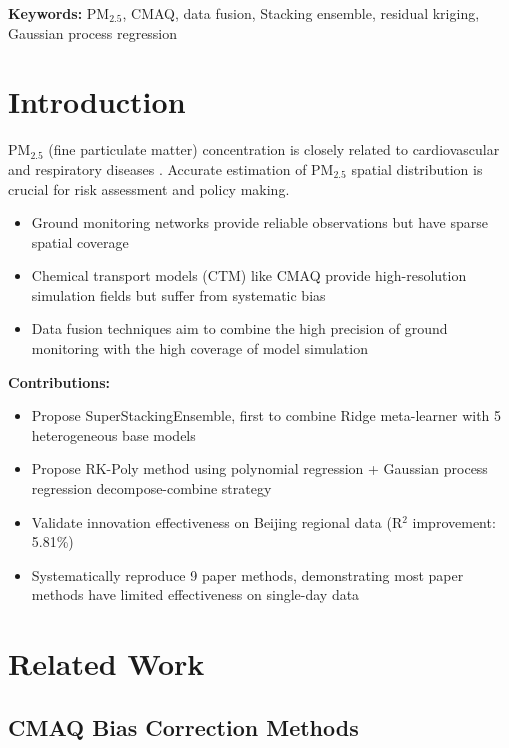 \medskip
\textbf{Keywords:} PM$_{2.5}$, CMAQ, data fusion, Stacking ensemble, residual kriging, Gaussian process regression

\newpage

\section{Introduction}
\label{sec:intro}

PM$_{2.5}$ (fine particulate matter) concentration is closely related to cardiovascular and respiratory diseases \citep{brook2010particulate}. Accurate estimation of PM$_{2.5}$ spatial distribution is crucial for risk assessment and policy making.

\begin{itemize}
    \item Ground monitoring networks provide reliable observations but have sparse spatial coverage
    \item Chemical transport models (CTM) like CMAQ provide high-resolution simulation fields but suffer from systematic bias
    \item Data fusion techniques aim to combine the high precision of ground monitoring with the high coverage of model simulation
\end{itemize}

\textbf{Contributions:}
\begin{itemize}
    \item Propose SuperStackingEnsemble, first to combine Ridge meta-learner with 5 heterogeneous base models
    \item Propose RK-Poly method using polynomial regression + Gaussian process regression decompose-combine strategy
    \item Validate innovation effectiveness on Beijing regional data (R$^2$ improvement: 5.81\%)
    \item Systematically reproduce 9 paper methods, demonstrating most paper methods have limited effectiveness on single-day data
\end{itemize}

\section{Related Work}
\label{sec:related}

\subsection{CMAQ Bias Correction Methods}

